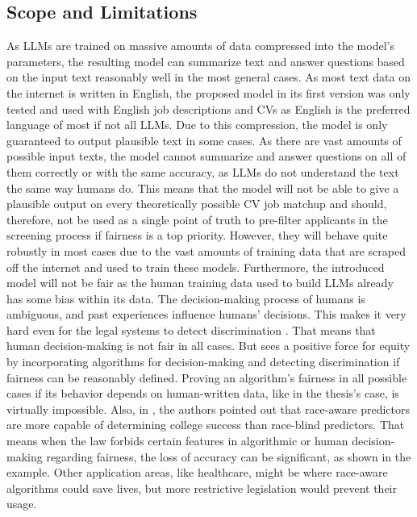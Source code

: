 \documentclass[draft,final]{thesisclass} %
\begin{document}
\subsection{Scope and Limitations}
As \gls{LLM}s are trained on massive amounts of data compressed into the model's parameters, the resulting model can summarize text and answer questions based on the input text reasonably well in the most general cases.
As most text data on the internet is written in English, the proposed model in its first version was only tested and used with English job descriptions and \acs{CV}s as English is the preferred language of most if not all \gls{LLM}s.
Due to this compression, the model is only guaranteed to output plausible text in some cases.
As there are vast amounts of possible input texts, the model cannot summarize and answer questions on all of them correctly or with the same accuracy, as \gls{LLM}s do not understand the text the same way humans do.
This means that the model will not be able to give a plausible output on every theoretically possible \acs{CV} job matchup and should, therefore, not be used as a single point of truth to pre-filter applicants in the screening process if fairness is a top priority.
However, they will behave quite robustly in most cases due to the vast amounts of training data that are scraped off the internet and used to train these models.
Furthermore, the introduced model will not be fair as the human training data used to build \gls{LLM}s already has some bias within its data. The decision-making process of humans is ambiguous, and past experiences influence humans' decisions. This makes it very hard even for the legal systems to detect discrimination \parencite[113]{discrimination_algorithms}. That means that human decision-making is not fair in all cases. But \textcite[113]{discrimination_algorithms} sees a positive force for equity by incorporating algorithms for decision-making and detecting discrimination if fairness can be reasonably defined. Proving an algorithm's fairness in all possible cases if its behavior depends on human-written data, like in the thesis's case, is virtually impossible. Also, in \textcite[158-160]{discrimination_algorithms}, the authors pointed out that race-aware predictors are more capable of determining college success than race-blind predictors.
That means when the law forbids certain features in algorithmic or human decision-making regarding fairness, the loss of accuracy can be significant, as shown in the example. Other application areas, like healthcare, might be where race-aware algorithms could save lives, but more restrictive legislation would prevent their usage.
\end{document}

